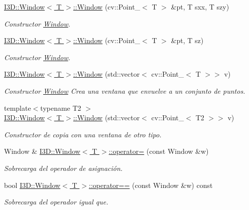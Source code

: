 \begin{DoxyCompactItemize}
\hyperlink{group___geometric_entities_ga15c278087e96c6d37db30cd667a17591}{I3\+D\+::\+Window$<$ T $>$\+::\+Window} (cv\+::\+Point\+\_\+$<$ T $>$ \&pt, T sxx, T szy)
\begin{DoxyCompactList}\small\item\em Constructor \hyperlink{class_i3_d_1_1_window}{Window}. \end{DoxyCompactList}\item 
\hyperlink{group___geometric_entities_gaa4c7acb8b82826e6fef1d9aeb00e6d2e}{I3\+D\+::\+Window$<$ T $>$\+::\+Window} (cv\+::\+Point\+\_\+$<$ T $>$ \&pt, T sz)
\begin{DoxyCompactList}\small\item\em Constructor \hyperlink{class_i3_d_1_1_window}{Window}. \end{DoxyCompactList}\item 
\hyperlink{group___geometric_entities_gad423e12e78a18a2c6bcd65172d2808b7}{I3\+D\+::\+Window$<$ T $>$\+::\+Window} (std\+::vector$<$ cv\+::\+Point\+\_\+$<$ T $>$$>$ v)
\begin{DoxyCompactList}\small\item\em Constructor \hyperlink{class_i3_d_1_1_window}{Window} Crea una ventana que envuelve a un conjunto de puntos. \end{DoxyCompactList}\item 
{\footnotesize template$<$typename T2 $>$ }\\\hyperlink{group___geometric_entities_gac888172a38a99ccd02e28b48aa89007d}{I3\+D\+::\+Window$<$ T $>$\+::\+Window} (std\+::vector$<$ cv\+::\+Point\+\_\+$<$ T2 $>$$>$ v)
\begin{DoxyCompactList}\small\item\em Constructor de copia con una ventana de otro tipo. \end{DoxyCompactList}\item 
Window \& \hyperlink{group___geometric_entities_gaaaa9e4a378be69b62a9a8717c220d706}{I3\+D\+::\+Window$<$ T $>$\+::operator=} (const Window \&w)
\begin{DoxyCompactList}\small\item\em Sobrecarga del operador de asignación. \end{DoxyCompactList}\item 
bool \hyperlink{group___geometric_entities_gaa67dcb4334c42c92c1bbb98bca40baac}{I3\+D\+::\+Window$<$ T $>$\+::operator==} (const Window \&w) const 
\begin{DoxyCompactList}\small\item\em Sobrecarga del operador \textquotesingle{}igual que\textquotesingle{}. \end{DoxyCompactList}\item 

\end{DoxyCompactItemize}
